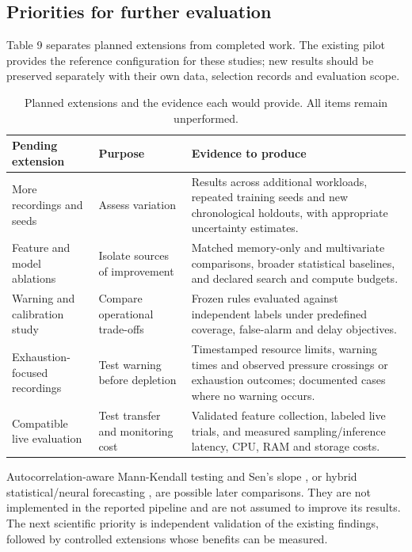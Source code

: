\documentclass[10pt,a4paper,twocolumn]{article}
\begin{document}
\subsection{Priorities for further evaluation}

Table 9 separates planned extensions from completed work. The existing pilot provides the reference configuration for these studies; new results should be preserved separately with their own data, selection records and evaluation scope.

\begin{table}[tbp]
\centering
\caption{Planned extensions and the evidence each would provide. All items remain unperformed.}
\label{tab:9}
\fontsize{8.5}{10.2}\selectfont
\setlength{\tabcolsep}{2.4pt}
\renewcommand{\arraystretch}{1.17}
\begin{tabularx}{\linewidth}{@{}L{0.75}L{0.7}L{1.55}@{}}
\toprule
\textbf{Pending extension} & \textbf{Purpose} & \textbf{Evidence to produce} \\
\midrule
More recordings and seeds & Assess variation & Results across additional workloads, repeated training seeds and new chronological holdouts, with appropriate uncertainty estimates. \\
Feature and model ablations & Isolate sources of improvement & Matched memory-only and multivariate comparisons, broader statistical baselines, and declared search and compute budgets. \\
Warning and calibration study & Compare operational trade-offs & Frozen rules evaluated against independent labels under predefined coverage, false-alarm and delay objectives. \\
Exhaustion-focused recordings & Test warning before depletion & Timestamped resource limits, warning times and observed pressure crossings or exhaustion outcomes; documented cases where no warning occurs. \\
Compatible live evaluation & Test transfer and monitoring cost & Validated feature collection, labeled live trials, and measured sampling/inference latency, CPU, RAM and storage costs. \\
\bottomrule
\end{tabularx}
\end{table}

Autocorrelation-aware Mann-Kendall testing and Sen's slope \cite{ref33,ref34,ref35}, or hybrid statistical/neural forecasting \cite{ref29,ref30,ref31}, are possible later comparisons. They are not implemented in the reported pipeline and are not assumed to improve its results. The next scientific priority is independent validation of the existing findings, followed by controlled extensions whose benefits can be measured.
\end{document}
